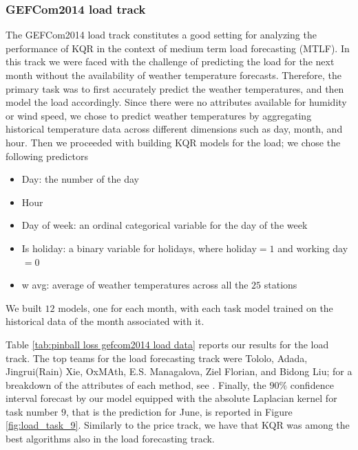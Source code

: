 \subsubsection{GEFCom2014 load track}
The GEFCom2014 load track constitutes a good setting for analyzing the performance of KQR in the context of medium term load forecasting (MTLF).
In this track we were faced with the challenge of predicting the load for the next month without the availability of weather temperature forecasts. 
Therefore, the primary task was to first accurately predict the weather temperatures, and then model the load accordingly. Since there were no attributes available for humidity or wind speed, we chose to predict weather temperatures by aggregating historical temperature data across different dimensions such as day, month, and hour. Then we proceeded with building KQR models for the load; we chose the following predictors
\begin{itemize}
    \item Day: the number of the day
    \item Hour
    \item Day of week: an ordinal categorical variable for the day of the week
    \item Is holiday: a binary variable for holidays, where holiday$=1$ and working day$=0$
    \item w avg: average of weather temperatures across all the $25$ stations
\end{itemize}
We built $12$ models, one for each month, with each task model trained on the historical data of the month associated with it.

Table \ref{tab:pinball loss gefcom2014 load data} reports our results for the load track. The top teams for the load forecasting track were Tololo, Adada, Jingrui(Rain) Xie, OxMAth, E.S. Managalova, Ziel Florian, and Bidong Liu; for a breakdown of the attributes of each method, see \cite[Table 6]{hong2016probabilistic}.
Finally, the $90\%$ confidence interval forecast by our model equipped with the absolute Laplacian kernel for task number $9$, that is the prediction for June, is reported in Figure \ref{fig:load_task_9}.
Similarly to the price track, we have that KQR was among the best algorithms also in the load forecasting track.

